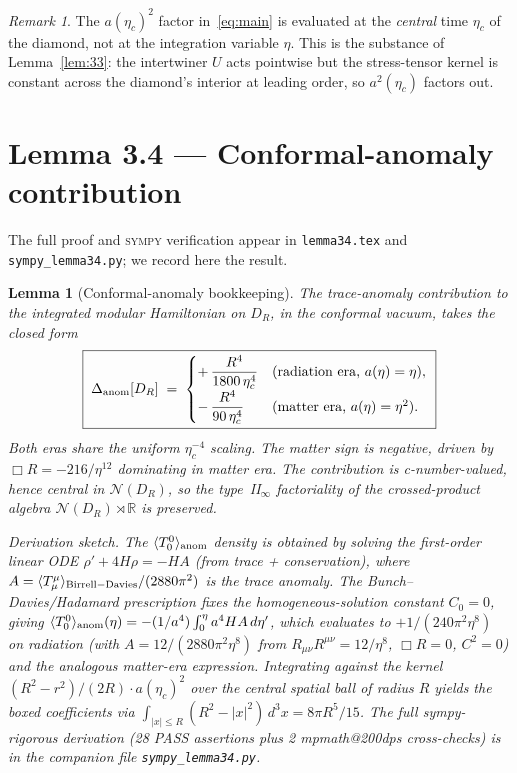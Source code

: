 \documentclass[11pt,a4paper]{article}
\newtheorem{lemma}[theorem]{Lemma}
\theoremstyle{remark}
\newtheorem{remark}[theorem]{Remark}
\newcommand{\R}{\mathbb{R}}
\newcommand{\N}{\mathcal{N}}
\begin{document}
\begin{remark}
The $a(\eta_c)^{2}$ factor in~\eqref{eq:main} is evaluated at the
\emph{central} time $\eta_c$ of the diamond, not at the integration
variable $\eta$. This is the substance of Lemma~\ref{lem:33}: the
intertwiner $U$ acts pointwise but the stress-tensor kernel is constant
across the diamond's interior at leading order, so $a^{2}(\eta_c)$
factors out.
\end{remark}

\section{Lemma 3.4 — Conformal-anomaly contribution}
\label{sec:lemma34}

The full proof and \textsc{sympy} verification appear in
\texttt{lemma34.tex} and \texttt{sympy\_lemma34.py}; we record here the
result.

\begin{lemma}[Conformal-anomaly bookkeeping]
\label{lem:34}
The trace-anomaly contribution to the integrated modular Hamiltonian on $D_R$,
in the conformal vacuum, takes the closed form
\begin{equation}
  \boxed{\;\Delta_{\rm anom}[D_R]\;=\;
  \begin{cases}\displaystyle
    +\,\frac{R^{4}}{1800\,\eta_c^{4}} & (\text{radiation era, } a(\eta)=\eta),\\[6pt]
    \displaystyle
    -\,\frac{R^{4}}{90\,\eta_c^{4}} & (\text{matter era, } a(\eta)=\eta^{2}).
  \end{cases}\;}
\label{eq:anom-boxed}
\end{equation}
Both eras share the uniform $\eta_c^{-4}$ scaling. The matter sign is
\emph{negative}, driven by $\Box R = -216/\eta^{12}$ dominating in matter
era. The contribution is c-number-valued, hence central in $\N(D_R)$, so
the type~II$_\infty$ factoriality of the crossed-product algebra
$\N(D_R)\rtimes\R$ \cite{Witten2022} is preserved.

\medskip
\emph{Derivation sketch.} The $\langle T^{0}_{0}\rangle_{\rm anom}$
density is obtained by solving the first-order linear ODE
$\rho' + 4H\rho = -H A$ (from trace + conservation), where $A=\langle
T^\mu_\mu\rangle_{\rm Birrell-Davies}/(2880\pi^2)$ is the trace anomaly.
The Bunch--Davies/Hadamard prescription fixes the homogeneous-solution
constant $C_0=0$, giving $\langle T^0_0\rangle_{\rm anom}(\eta) =
-(1/a^4)\int_0^\eta a^4 H A\,d\eta'$, which evaluates to
$+1/(240\pi^2\eta^8)$ on radiation (with $A=12/(2880\pi^2 \eta^8)$ from
$R_{\mu\nu}R^{\mu\nu}=12/\eta^8$, $\Box R=0$, $C^2=0$) and the analogous
matter-era expression. Integrating against the kernel
$(R^2-r^2)/(2R)\cdot a(\eta_c)^2$ over the central spatial ball of
radius $R$ yields the boxed coefficients via
$\int_{|x|\le R}(R^2-|x|^2)\,d^3x = 8\pi R^5/15$.
The full sympy-rigorous derivation (28 PASS assertions plus 2
mpmath@200dps cross-checks) is in the companion file
\texttt{sympy\_lemma34.py}.
\end{lemma}
\end{document}
